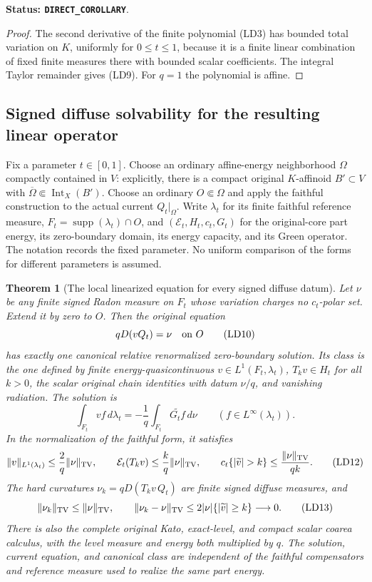 \documentclass[11pt,a4paper]{article}
\numberwithin{equation}{section}
\newtheorem{theorem}{Theorem}[section]
\theoremstyle{definition}
\theoremstyle{remark}
\begin{document}
\noindent\textbf{Status: \texttt{DIRECT\_COROLLARY}}.

\begin{proof}
The second derivative of the finite polynomial (LD3) has bounded
total variation on $K$, uniformly for $0\le t\le1$, because it is a
finite linear combination of fixed finite measures there with bounded
scalar coefficients.  The integral Taylor remainder gives (LD9).
For $q=1$ the polynomial is affine.
\end{proof}

\subsection{Signed diffuse solvability for the resulting linear operator}

Fix a parameter $t\in[0,1]$.  Choose an ordinary affine-energy
neighborhood $\Omega$ compactly contained in $V$: explicitly, there
is a compact original $K$-affinoid $B'\subset V$ with
$\overline\Omega\Subset\operatorname{Int}_X(B')$.
Choose an ordinary $O\Subset\Omega$ and apply the faithful
construction to the actual current $Q_t|_\Omega$.
Write $\lambda_t$ for its finite faithful reference measure,
$F_t=\operatorname{supp}(\lambda_t)\cap O$, and
$(\mathcal E_t,H_t,c_t,G_t)$ for the original-core part energy,
its zero-boundary domain, its energy capacity, and its Green operator.
The notation records the fixed parameter.  No uniform comparison of
the forms for different parameters is assumed.

\begin{theorem}[The local linearized equation for every signed diffuse datum]
\label{thm:r11-local-linearized-diffuse-Dirichlet}
Let $\nu$ be any finite signed Radon measure on $F_t$ whose variation
charges no $c_t$-polar set.  Extend it by zero to $O$.
Then the original equation
\[
                            qD(vQ_t)=\nu\quad\hbox{on }O
 \tag{LD10}
\]
has exactly one canonical relative renormalized zero-boundary solution.
Its class is the one defined by finite energy-quasicontinuous
$v\in L^1(F_t,\lambda_t)$, $T_kv\in H_t$ for all $k>0$, the scalar
original chain identities with datum $\nu/q$, and vanishing radiation.
The solution is
\[
 \int_{F_t}vf\,d\lambda_t
                 =-\frac1q\int_{F_t}\widetilde{G_tf}\,d\nu
                  \qquad(f\in L^\infty(\lambda_t)).
 \tag{LD11}
\]
In the normalization of the faithful form, it satisfies
\[
 \|v\|_{L^1(\lambda_t)}\le\frac2q\|\nu\|_{\rm TV},\qquad
 \mathcal E_t(T_kv)\le\frac{k}{q}\|\nu\|_{\rm TV},\qquad
 c_t\{|\widetilde v|>k\}\le\frac{\|\nu\|_{\rm TV}}{qk}.
 \tag{LD12}
\]
The hard curvatures $\nu_k=qD(T_kv\,Q_t)$ are finite signed diffuse
measures, and
\[
 \|\nu_k\|_{\rm TV}\le\|\nu\|_{\rm TV},\qquad
 \|\nu_k-\nu\|_{\rm TV}
                  \le2|\nu|\{|\widetilde v|\ge k\}\longrightarrow0.
 \tag{LD13}
\]
There is also the complete original Kato, exact-level, and compact
scalar coarea calculus, with the level measure and energy both
multiplied by $q$.  The solution, current equation, and canonical
class are independent of the faithful compensators and reference
measure used to realize the same part energy.
\end{theorem}
\end{document}
